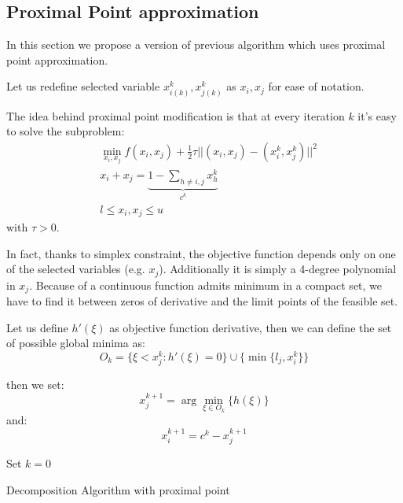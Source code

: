 \subsection{Proximal Point approximation}
In this section we propose a version of previous algorithm which uses proximal point approximation.

Let us redefine selected variable $x^k_{i(k)},x^k_{j(k)}$ as $x_{i},x_{j}$ for ease of notation.

The idea behind proximal point modification is that at every iteration $k$ it's easy to solve the subproblem:
\begin{align}
 &\min_{x_i,x_j} f(x_i,x_j)+ \frac{1}{2} \tau||(x_i,x_j)-(x_i^k,x_j^k)||^2\\
 &x_i+x_j = \underbrace{1-\sum_{h \ne i,j} x^k_h}_{c^k}\\
 &l \le x_i,x_j\le u
 \end{align}
with $\tau>0$.

In fact, thanks to simplex constraint, the objective function depends only on one of the selected variables (e.g. $x_j$). 
Additionally it is simply a 4-degree polynomial in $x_j$.
Because of a continuous function admits minimum in a compact set, we have to find it between zeros of derivative and the limit points of the feasible set.

Let us define $h'(\xi)$ as objective function derivative, then we can define the set of possible global minima as:
\begin{equation}
 O_k = \{ \xi < x_j^k: h'(\xi)=0\} \cup \{\min\{l_j,x_i^k\} \}
\end{equation}

then we set:
\begin{equation}
x_j^{k+1}= \arg \min_{\xi \in O_k} \{h(\xi)\}
\end{equation}
and:
\begin{equation}
x_i^{k+1}= c^{k}-x^{k+1}_j
\end{equation}



\begin{algorithm}[ht]
 Set $k = 0$\\
 \caption{Decomposition Algorithm with proximal point}
 \label{alg:proximal}
\end{algorithm}

